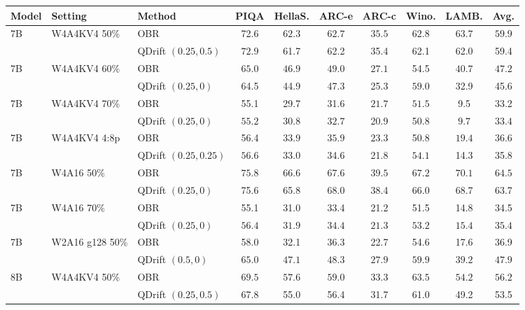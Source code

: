 \begin{tabular}{lllccccccc}
\toprule
Model & Setting & Method & PIQA & HellaS. & ARC-e & ARC-c & Wino. & LAMB. & Avg. \\
\midrule
7B & W4A4KV4 50\% & OBR & 72.6 & $\mathbf{62.3}$ & $\mathbf{62.7}$ & $\mathbf{35.5}$ & $\mathbf{62.8}$ & $\mathbf{63.7}$ & $\mathbf{59.9}$ \\
 &  & QDrift $(0.25, 0.5)$ & $\mathbf{72.9}$ & 61.7 & 62.2 & 35.4 & 62.1 & 62.0 & 59.4 \\
7B & W4A4KV4 60\% & OBR & $\mathbf{65.0}$ & $\mathbf{46.9}$ & $\mathbf{49.0}$ & $\mathbf{27.1}$ & 54.5 & $\mathbf{40.7}$ & $\mathbf{47.2}$ \\
 &  & QDrift $(0.25, 0)$ & 64.5 & 44.9 & 47.3 & 25.3 & $\mathbf{59.0}$ & 32.9 & 45.6 \\
7B & W4A4KV4 70\% & OBR & 55.1 & 29.7 & 31.6 & $\mathbf{21.7}$ & $\mathbf{51.5}$ & 9.5 & 33.2 \\
 &  & QDrift $(0.25, 0)$ & $\mathbf{55.2}$ & $\mathbf{30.8}$ & $\mathbf{32.7}$ & 20.9 & 50.8 & $\mathbf{9.7}$ & $\mathbf{33.4}$ \\
7B & W4A4KV4 4:8p & OBR & 56.4 & $\mathbf{33.9}$ & $\mathbf{35.9}$ & $\mathbf{23.3}$ & 50.8 & $\mathbf{19.4}$ & $\mathbf{36.6}$ \\
 &  & QDrift $(0.25, 0.25)$ & $\mathbf{56.6}$ & 33.0 & 34.6 & 21.8 & $\mathbf{54.1}$ & 14.3 & 35.8 \\
7B & W4A16 50\% & OBR & $\mathbf{75.8}$ & $\mathbf{66.6}$ & 67.6 & $\mathbf{39.5}$ & $\mathbf{67.2}$ & $\mathbf{70.1}$ & $\mathbf{64.5}$ \\
 &  & QDrift $(0.25, 0)$ & 75.6 & 65.8 & $\mathbf{68.0}$ & 38.4 & 66.0 & 68.7 & 63.7 \\
7B & W4A16 70\% & OBR & 55.1 & 31.0 & 33.4 & 21.2 & 51.5 & 14.8 & 34.5 \\
 &  & QDrift $(0.25, 0)$ & $\mathbf{56.4}$ & $\mathbf{31.9}$ & $\mathbf{34.4}$ & $\mathbf{21.3}$ & $\mathbf{53.2}$ & $\mathbf{15.4}$ & $\mathbf{35.4}$ \\
7B & W2A16 g128 50\% & OBR & 58.0 & 32.1 & 36.3 & 22.7 & 54.6 & 17.6 & 36.9 \\
 &  & QDrift $(0.5, 0)$ & $\mathbf{65.0}$ & $\mathbf{47.1}$ & $\mathbf{48.3}$ & $\mathbf{27.9}$ & $\mathbf{59.9}$ & $\mathbf{39.2}$ & $\mathbf{47.9}$ \\
\midrule
8B & W4A4KV4 50\% & OBR & $\mathbf{69.5}$ & $\mathbf{57.6}$ & $\mathbf{59.0}$ & $\mathbf{33.3}$ & $\mathbf{63.5}$ & $\mathbf{54.2}$ & $\mathbf{56.2}$ \\
 &  & QDrift $(0.25, 0.5)$ & 67.8 & 55.0 & 56.4 & 31.7 & 61.0 & 49.2 & 53.5 \\

\end{tabular}
